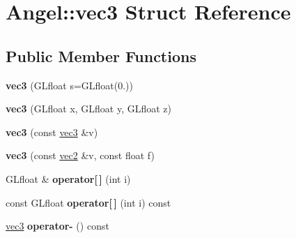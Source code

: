 \hypertarget{struct_angel_1_1vec3}{\section{\-Angel\-:\-:vec3 \-Struct \-Reference}
\label{struct_angel_1_1vec3}
}
\subsection*{\-Public \-Member \-Functions}
\begin{DoxyCompactItemize}
\item 
\hypertarget{struct_angel_1_1vec3_a420358f913d30a659761e3a86026cd59}{{\bfseries vec3} (\-G\-Lfloat s=\-G\-Lfloat(0.))}\label{struct_angel_1_1vec3_a420358f913d30a659761e3a86026cd59}

\item 
\hypertarget{struct_angel_1_1vec3_a9970b9133cd349d038456ae7309fbeba}{{\bfseries vec3} (\-G\-Lfloat x, \-G\-Lfloat y, \-G\-Lfloat z)}\label{struct_angel_1_1vec3_a9970b9133cd349d038456ae7309fbeba}

\item 
\hypertarget{struct_angel_1_1vec3_a3af0b92e9cb01f0cda2f66c007e196c9}{{\bfseries vec3} (const \hyperlink{struct_angel_1_1vec3}{vec3} \&v)}\label{struct_angel_1_1vec3_a3af0b92e9cb01f0cda2f66c007e196c9}

\item 
\hypertarget{struct_angel_1_1vec3_a597ff15b14f6bd9e75382525f6da00bd}{{\bfseries vec3} (const \hyperlink{struct_angel_1_1vec2}{vec2} \&v, const float f)}\label{struct_angel_1_1vec3_a597ff15b14f6bd9e75382525f6da00bd}

\item 
\hypertarget{struct_angel_1_1vec3_aa232572ba7ee6e695759a57678924a67}{\-G\-Lfloat \& {\bfseries operator\mbox{[}$\,$\mbox{]}} (int i)}\label{struct_angel_1_1vec3_aa232572ba7ee6e695759a57678924a67}

\item 
\hypertarget{struct_angel_1_1vec3_ad78e907775d490a69aa879a34e7dfe5c}{const \-G\-Lfloat {\bfseries operator\mbox{[}$\,$\mbox{]}} (int i) const }\label{struct_angel_1_1vec3_ad78e907775d490a69aa879a34e7dfe5c}

\item 
\hypertarget{struct_angel_1_1vec3_a5ec954ef19e3d1ceed6ce25ebe32c3ee}{\hyperlink{struct_angel_1_1vec3}{vec3} {\bfseries operator-\/} () const }\label{struct_angel_1_1vec3_a5ec954ef19e3d1ceed6ce25ebe32c3ee}


\end{DoxyCompactItemize}
